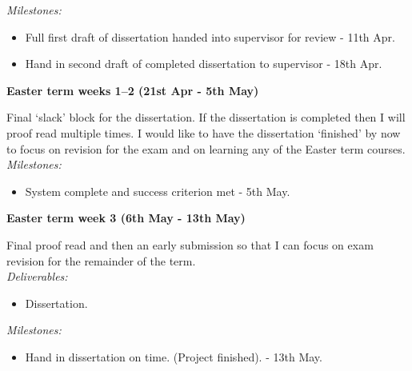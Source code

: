 {\em Milestones:}
\begin{itemize}
    \item 
    Full first draft of dissertation handed into supervisor for review - 11th 
    Apr.
    \item 
    Hand in second draft of completed dissertation to supervisor - 18th Apr.
\end{itemize}


{\bf Easter term weeks 1--2 (21st Apr - 5th May)}  

Final `slack' block for the dissertation. If the dissertation is completed then 
I will proof read multiple times. I would like to have the dissertation 
`finished' by now to focus on revision for the exam and on learning any of the 
Easter term courses. \\

{\em Milestones:}
\begin{itemize}
    \item 
    System complete and success criterion met - 5th May.
\end{itemize}



{\bf Easter term week 3 (6th May - 13th May)} 

Final proof read and then an early submission so that I can focus on exam 
revision for the remainder of the term. \\

{\em Deliverables:} 
\begin{itemize} 
    \item 
    Dissertation.
\end{itemize}

{\em Milestones:}
\begin{itemize}
    \item 
    Hand in dissertation on time. (Project finished). - 13th May.
\end{itemize}


